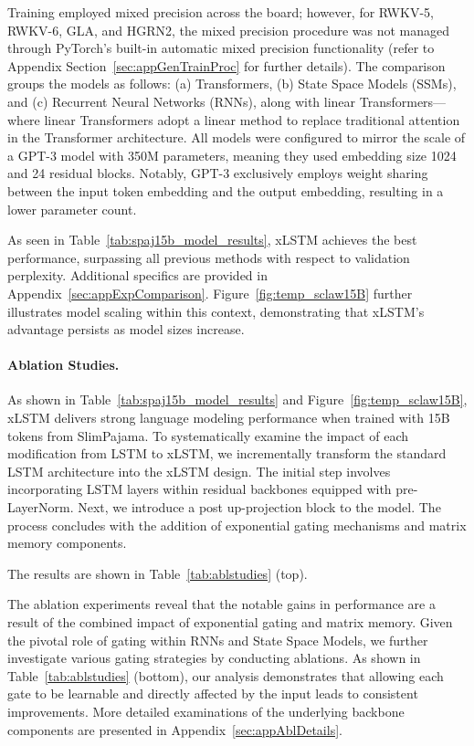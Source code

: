 Training employed mixed precision across the board; however, for RWKV-5, RWKV-6, GLA, and HGRN2, the mixed precision procedure was not managed through PyTorch’s built-in automatic mixed precision functionality (refer to Appendix Section~\ref{sec:appGenTrainProc} for further details). The comparison groups the models as follows: (a) Transformers, (b) State Space Models (SSMs), and (c) Recurrent Neural Networks (RNNs), along with linear Transformers—where linear Transformers adopt a linear method to replace traditional attention in the Transformer architecture. All models were configured to mirror the scale of a GPT-3 model with 350M parameters, meaning they used embedding size 1024 and 24 residual blocks. Notably, GPT-3 exclusively employs weight sharing between the input token embedding and the output embedding, resulting in a lower parameter count.

As seen in Table~\ref{tab:spaj15b_model_results}, xLSTM achieves the best performance, surpassing all previous methods with respect to validation perplexity. Additional specifics are provided in Appendix~\ref{sec:appExpComparison}. Figure~\ref{fig:temp_sclaw15B} further illustrates model scaling within this context, demonstrating that xLSTM’s advantage persists as model sizes increase.

\paragraph{Ablation Studies.}
As shown in Table~\ref{tab:spaj15b_model_results} and Figure~\ref{fig:temp_sclaw15B}, xLSTM delivers strong language modeling performance when trained with 15B tokens from SlimPajama. To systematically examine the impact of each modification from LSTM to xLSTM, we incrementally transform the standard LSTM architecture into the xLSTM design. The initial step involves incorporating LSTM layers within residual backbones equipped with pre-LayerNorm. Next, we introduce a post up-projection block to the model. The process concludes with the addition of exponential gating mechanisms and matrix memory components.

The results are shown in Table~\ref{tab:ablstudies} (top). 

The ablation experiments reveal that the notable gains in performance are a result of the combined impact of exponential gating and matrix memory. Given the pivotal role of gating within RNNs and State Space Models, we further investigate various gating strategies by conducting ablations. As shown in Table~\ref{tab:ablstudies} (bottom), our analysis demonstrates that allowing each gate to be learnable and directly affected by the input leads to consistent improvements. More detailed examinations of the underlying backbone components are presented in Appendix~\ref{sec:appAblDetails}.

